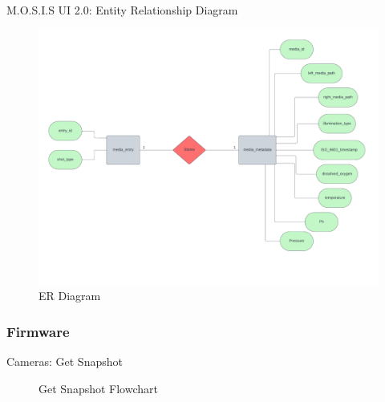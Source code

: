\documentclass[17pt, aspectratio=169]{beamer}
\begin{document}
\begin{frame}{M.O.S.I.S UI 2.0: Entity Relationship Diagram}
	\begin{figure}
		\includegraphics[page=1,height=0.65\textheight]{../../Progress_Report_Document/Appendix/Design_Documentation/ER_Diagram/Figures/ER_Diagram_MOSIS.pdf}
		\caption{ER Diagram}
	\end{figure}
\end{frame}
\subsubsection*{Firmware}
\begin{frame}{Cameras: Get Snapshot}
	\begin{figure}[H]
		\begin{center}
			\begin{small}
			\end{small}
		\end{center}
		\caption{Get Snapshot Flowchart}
	\end{figure}
\end{frame}
\end{document}
